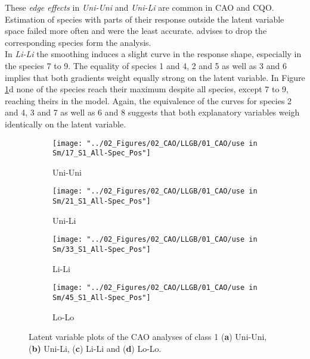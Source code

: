 		These \textit{edge effects} in \textit{Uni-Uni} and \textit{Uni-Li} are common in CAO and CQO. 
		Estimation of species with parts of their response outside the latent variable space failed more often and were the least accurate. \citet{yee2015vector} advises to drop the corresponding species form the analysis.\\
		In \textit{Li-Li} the smoothing induces a slight curve in the response shape, especially in the species 7 to 9. 
		The equality of species 1 and 4, 2 and 5 as well as 3 and 6 implies that both gradients weight equally strong on the latent variable. 
		In Figure \ref{fig:smcaoord}d none of the species reach their maximum despite all species, except 7 to 9, reaching theirs in the model. 
		Again, the equivalence of the curves for species 2 and 4, 3 and 7 as well as 6 and 8 suggests that both explanatory variables weigh identically on the latent variable. 
	
		\begin{figure}[h]
			
			\begin{subfigure}{.55\textwidth}		
				\centering
				\texttt{[image: "../02\_Figures/02\_CAO/LLGB/01\_CAO/use in Sm/17\_S1\_All-Spec\_Pos"]}
				\caption{Uni-Uni}
			\end{subfigure}
			\begin{subfigure}{.55\textwidth}
				\centering		
				\texttt{[image: "../02\_Figures/02\_CAO/LLGB/01\_CAO/use in Sm/21\_S1\_All-Spec\_Pos"]}
				\caption{Uni-Li}
			\end{subfigure}
			\begin{subfigure}{.55\textwidth}	
				\centering	
				\texttt{[image: "../02\_Figures/02\_CAO/LLGB/01\_CAO/use in Sm/33\_S1\_All-Spec\_Pos"]}
				\caption{Li-Li}
			\end{subfigure}
			\begin{subfigure}{.55\textwidth}		
				\centering
			\texttt{[image: "../02\_Figures/02\_CAO/LLGB/01\_CAO/use in Sm/45\_S1\_All-Spec\_Pos"]}
				\caption{Lo-Lo}
			\end{subfigure}
			
			\caption{
				Latent variable plots of the CAO analyses of class 1 (\textbf{a}) Uni-Uni, (\textbf{b)} Uni-Li, (\textbf{c}) Li-Li and (\textbf{d}) Lo-Lo. 
					}
			\label{fig:smcaoord}
			
		\end{figure}
	

